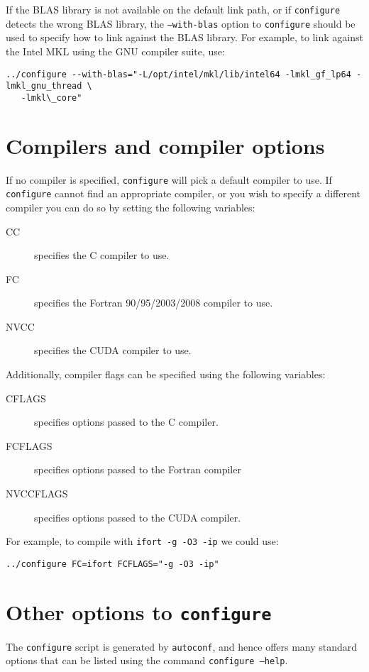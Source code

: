 \documentclass{spral}
\begin{document}
If the BLAS library is not available on the default link path, or if
\texttt{configure} detects the wrong BLAS library, the \texttt{--with-blas}
option to \texttt{configure} should be used to specify how to link against
the BLAS library. For example, to link against the Intel MKL using the GNU
compiler suite, use: \\
\begin{verbatim}
../configure --with-blas="-L/opt/intel/mkl/lib/intel64 -lmkl_gf_lp64 -lmkl_gnu_thread \
   -lmkl\_core"
\end{verbatim}

\section{Compilers and compiler options}
If no compiler is specified, \texttt{configure} will pick a default
compiler to use. If \texttt{configure} cannot find an appropriate compiler, or
you wish to specify a different compiler you can do so by setting the following
variables:
\begin{description}
   \item[CC] specifies the C compiler to use.
   \item[FC] specifies the Fortran 90/95/2003/2008 compiler to use.
   \item[NVCC] specifies the CUDA compiler to use.
\end{description}
\vspace{0.1cm}

\noindent
Additionally, compiler flags can be specified using the following variables:
\begin{description}
   \item[CFLAGS] specifies options passed to the C compiler.
   \item[FCFLAGS] specifies options passed to the Fortran compiler
   \item[NVCCFLAGS] specifies options passed to the CUDA compiler.
\end{description}
\vspace{0.1cm}

\noindent
For example, to compile with \texttt{ifort -g -O3 -ip} we could use:
\begin{verbatim}
../configure FC=ifort FCFLAGS="-g -O3 -ip"
\end{verbatim}

\section{Other options to \texttt{configure}}
The \texttt{configure} script is generated by \texttt{autoconf}, and hence
offers many standard options that can be listed using the command
\texttt{configure --help}.
\end{document}
